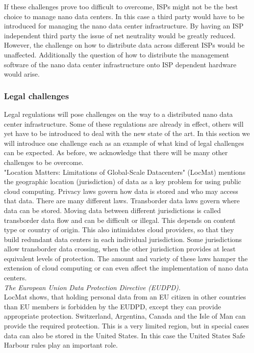 
If these challenges prove too difficult to overcome, ISPs might not be the best choice to manage nano data centers. In this case a third party would have to be introduced for managing the nano data center infrastructure. By having an ISP independent third party the issue of net neutrality would be greatly reduced. However, the challenge on how to distribute data across different ISPs would be unaffected. Additionally the question of how to distribute the management software of the nano data center infrastructure onto ISP dependent hardware would arise. 


\subsubsection{Legal challenges}
Legal regulations will pose challenges on the way to a distributed nano data center infrastructure. Some of these regulations are already in effect, others will yet have to be introduced to deal with the new state of the art. In this section we will introduce one challenge each as an example of what kind of legal challenges can be expected. As before, we acknowledge that there will be many other challenges to be overcome.\\

"Location Matters: Limitations of Global-Scale Datacenters" (LocMat) \cite{locmat} mentions the geographic location (jurisdiction) of data as a key problem for using public cloud computing. Privacy laws govern how data is stored and who may access that data. There are many different laws. Transborder data laws govern where data can be stored. Moving data between different jurisdictions is called transborder data flow and can be difficult or illegal. This depends on content type or country of origin. This also intimidates cloud providers, so that they build redundant data centers in each individual jurisdiction. Some jurisdictions allow transborder data crossing, when the other jurisdiction provides at least equivalent levels of protection. The amount and variety of these laws hamper the extension of cloud computing or can even affect the implementation of nano data centers.\\

\textit{The European Union Data Protection Directive (EUDPD). }\\
LocMat \cite{locmat} shows, that holding personal data from an EU citizen in other countries than EU members is forbidden by the EUDPD, except they can provide appropriate protection. Switzerland, Argentina, Canada and the Isle of Man can provide the required protection. This is a very limited region, but in special cases data can also be stored in the United States. In this case the United States Safe Harbour rules play an important role.\\


